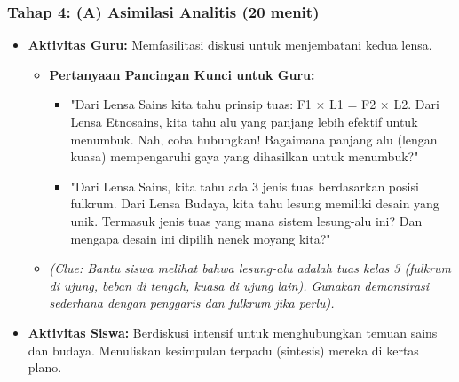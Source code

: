 \documentclass[a4paper,12pt]{article}
\begin{document}
\subsubsection{Tahap 4: (A) Asimilasi Analitis (20 menit)}
\begin{itemize}
\item \textbf{Aktivitas Guru:} Memfasilitasi diskusi untuk menjembatani kedua lensa.
    \begin{itemize}
    \item \textbf{Pertanyaan Pancingan Kunci untuk Guru:}
        \begin{itemize}
        \item "Dari Lensa Sains kita tahu prinsip tuas: F1 × L1 = F2 × L2. Dari Lensa Etnosains, kita tahu alu yang panjang lebih efektif untuk menumbuk. Nah, coba hubungkan! Bagaimana panjang alu (lengan kuasa) mempengaruhi gaya yang dihasilkan untuk menumbuk?"
        \item "Dari Lensa Sains, kita tahu ada 3 jenis tuas berdasarkan posisi fulkrum. Dari Lensa Budaya, kita tahu lesung memiliki desain yang unik. Termasuk jenis tuas yang mana sistem lesung-alu ini? Dan mengapa desain ini dipilih nenek moyang kita?"
        \end{itemize}
    \item \textit{(Clue: Bantu siswa melihat bahwa lesung-alu adalah tuas kelas 3 (fulkrum di ujung, beban di tengah, kuasa di ujung lain). Gunakan demonstrasi sederhana dengan penggaris dan fulkrum jika perlu).}
    \end{itemize}
\item \textbf{Aktivitas Siswa:} Berdiskusi intensif untuk menghubungkan temuan sains dan budaya. Menuliskan kesimpulan terpadu (sintesis) mereka di kertas plano.
\end{itemize}
\end{document}

